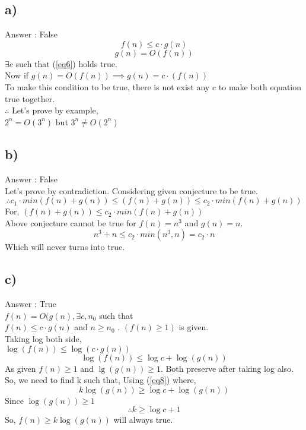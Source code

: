 \documentclass[a4paper, 11pt]{article}
\begin{document}
\subsection*{a)}
Answer : False
\begin{equation}
\label{eq6}
f(n) \le c \cdot g(n)
\end{equation}
\begin{equation}
\label{eq7}
g(n) = O(f(n))
\end{equation}
$\exists c $ such that (\ref{eq6}) holds true.\\
Now if $g(n)=O(f(n)) \implies g(n) = c \cdot (f(n))$\\
To make this condition to be true, there is not exist any c to make both equation true together.\\
$\therefore$ Let's prove by example,\\
$2^n = O(3^n)$ but $3^n \ne O(2^n)$

\subsection*{b)}
Answer : False\\
Let's prove by contradiction. Considering given conjecture to be true.
$$\therefore c_{1} \cdot min(f(n)+g(n)) \le (f(n)+g(n)) \le c_{2} \cdot min(f(n)+g(n))$$
For, $(f(n)+g(n)) \le c_{2} \cdot min(f(n)+g(n))$\\
Above conjecture cannot be true for $f(n) = n^3$ and $g(n)=n$.
$$n^3 + n \le c_{2} \cdot min(n^3,n) = c_{2} \cdot n$$
Which will never turns into true.

\subsection*{c)}
Answer : True\\
$f(n) = O(g(n), \exists c, n_{0} $ such that \\
$f(n) \le c \cdot g(n)$ and $n \ge n_{0}$ . $(f(n) \ge 1) $ is given.\\
Taking log both side,\\
$ \log (f(n)) \le \log (c \cdot g(n))$
\begin{equation}
\label{eq8}
\log(f(n)) \le \log c + \log(g(n))
\end{equation}
As given $f(n) \ge 1 $ and $\lg (g(n)) \ge 1 $. Both preserve after taking log also.\\ So, we need to find k such that, Using (\ref{eq8}) where,
$$k \log (g(n)) \ge \log c + \log (g(n))$$ Since $\log (g(n)) \ge 1 $
$$\therefore k \ge \log c +1 $$
So, $f(n) \ge k \log (g(n))$ will always true.
\end{document}
